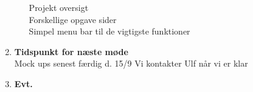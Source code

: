 \begin{enumerate}
\begin{itemize}[-]
				
				\newpage
				Projekt oversigt \\				
				Forskellige opgave sider \\
				Simpel menu bar til de vigtigste funktioner \\
								
				
		\end{itemize}	
		\item \textbf{Tidspunkt for næste møde}\\
			Mock ups senest færdig d. 15/9
			Vi kontakter Ulf når vi er klar
		\item \textbf{Evt.}
	\end{enumerate}
